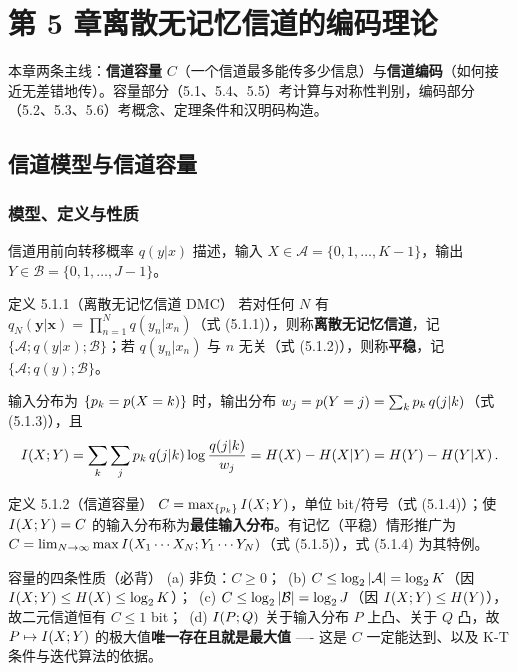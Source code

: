 \section{第 5 章\quad 离散无记忆信道的编码理论}

本章两条主线：\textbf{信道容量} $C$（一个信道最多能传多少信息）与\textbf{信道编码}（如何接近无差错地传）。容量部分（5.1、5.4、5.5）考计算与对称性判别，编码部分（5.2、5.3、5.6）考概念、定理条件和汉明码构造。

\subsection{信道模型与信道容量}

\subsubsection{模型、定义与性质}

信道用前向转移概率 $q(y|x)$ 描述，输入 $X\in\mathcal{A}=\{0,1,\dots,K-1\}$，输出 $Y\in\mathcal{B}=\{0,1,\dots,J-1\}$。

\begin{defbox}{定义 5.1.1（离散无记忆信道 DMC）}
若对任何 $N$ 有 $q_N(\mathbf{y}|\mathbf{x})=\prod_{n=1}^{N}q(y_n|x_n)$（式 (5.1.1)），则称\textbf{离散无记忆信道}，记 $\{\mathcal{A};q(y|x);\mathcal{B}\}$；若 $q(y_n|x_n)$ 与 $n$ 无关（式 (5.1.2)），则称\textbf{平稳}，记 $\{\mathcal{A};q(y);\mathcal{B}\}$。
\end{defbox}

输入分布为 $\{p_k=p\!\left(X=k\right)\}$ 时，输出分布 $w_j=p\!\left(Y=j\right)=\sum_k p_k\,q(j|k)$（式 (5.1.3)），且
\begin{equation*}
I\!\left(X;Y\right)=\sum_k\sum_j p_k\,q(j|k)\log\frac{q(j|k)}{w_j}
=H\!\left(X\right)-H\!\left(X|Y\right)=H\!\left(Y\right)-H\!\left(Y|X\right).
\end{equation*}

\begin{defbox}{定义 5.1.2（信道容量）}
$C=\max_{\{p_k\}}I\!\left(X;Y\right)$，单位 bit/符号（式 (5.1.4)）；使 $I\!\left(X;Y\right)=C$ 的输入分布称为\textbf{最佳输入分布}。有记忆（平稳）情形推广为 $C=\lim_{N\to\infty}\max I\!\left(X_1\cdots X_N;Y_1\cdots Y_N\right)$（式 (5.1.5)），式 (5.1.4) 为其特例。
\end{defbox}

\begin{keypoint}{容量的四条性质（必背）}
(a) 非负：$C\ge0$；\ (b) $C\le\log_{2}|\mathcal{A}|=\log_{2} K$（因 $I\!\left(X;Y\right)\le H\!\left(X\right)\le\log_{2} K$）；\ (c) $C\le\log_{2}|\mathcal{B}|=\log_{2} J$（因 $I\!\left(X;Y\right)\le H\!\left(Y\right)$），故二元信道恒有 $C\le1$ bit；\ (d) $I\!\left(P;Q\right)$ 关于输入分布 $P$ 上凸、关于 $Q$ 凸，故 $P\mapsto I\!\left(X;Y\right)$ 的极大值\textbf{唯一存在且就是最大值} ---- 这是 $C$ 一定能达到、以及 K-T 条件与迭代算法的依据。
\end{keypoint}

